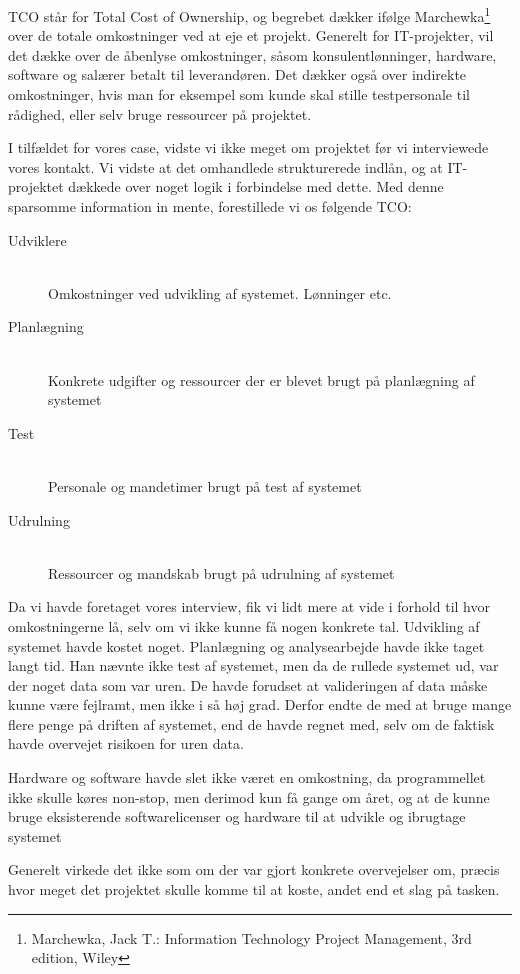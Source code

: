 TCO står for Total Cost of Ownership, og begrebet dækker ifølge
Marchewka\footnote{Marchewka, Jack T.: Information Technology Project
Management, 3rd edition, Wiley} over de totale omkostninger ved at eje et
projekt. Generelt for IT-projekter, vil det dække over de åbenlyse omkostninger,
såsom konsulentlønninger, hardware, software og salærer betalt til leverandøren.
Det dækker også over indirekte omkostninger, hvis man for eksempel som kunde
skal stille testpersonale til rådighed, eller selv bruge ressourcer på
projektet.

I tilfældet for vores case, vidste vi ikke meget om projektet før vi
interviewede vores kontakt. Vi vidste at det omhandlede strukturerede indlån, og
at IT-projektet dækkede over noget logik i forbindelse med dette. Med denne
sparsomme information in mente, forestillede vi os følgende TCO:

\begin{description}
  \item[Udviklere]\hfill
  \\
  Omkostninger ved udvikling af systemet. Lønninger etc.
  \item[Planlægning] \hfill
  \\
  Konkrete udgifter og ressourcer der er blevet brugt på planlægning af systemet
  \item[Test]\hfill
  \\
  Personale og mandetimer brugt på test af systemet
  \item[Udrulning]\hfill
  \\
  Ressourcer og mandskab brugt på udrulning af systemet
\end{description}

Da vi havde foretaget vores interview, fik vi lidt mere at vide i forhold til
hvor omkostningerne lå, selv om vi ikke kunne få nogen konkrete tal. Udvikling
af systemet havde kostet noget. Planlægning og analysearbejde havde ikke taget
langt tid. Han nævnte ikke test af systemet, men da de rullede systemet ud, var
der noget data som var uren. De havde forudset at valideringen af data måske
kunne være fejlramt, men ikke i så høj grad. Derfor endte de med at bruge mange
flere penge på driften af systemet, end de havde regnet med, selv om de faktisk
havde overvejet risikoen for uren data.

Hardware og software havde slet ikke været en omkostning, da programmellet ikke
skulle køres non-stop, men derimod kun få gange om året, og at de kunne bruge
eksisterende softwarelicenser og hardware til at udvikle og ibrugtage systemet

Generelt virkede det ikke som om der var gjort konkrete overvejelser om, præcis
hvor meget det projektet skulle komme til at koste, andet end et slag på tasken. 
